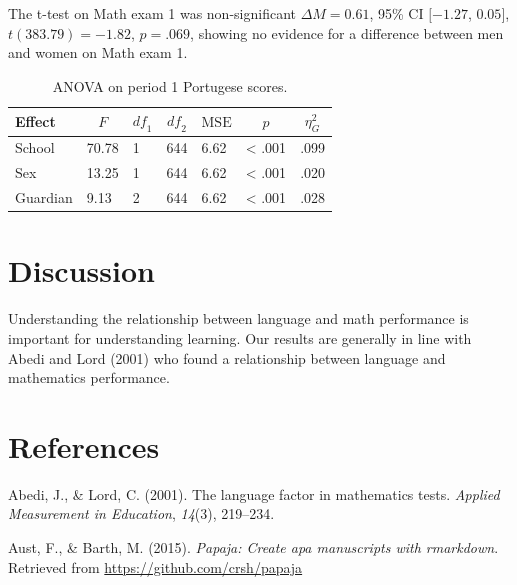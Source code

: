 \documentclass[english,floatsintext,man]{apa6}
\theoremstyle{definition}
\theoremstyle{definition}
\theoremstyle{definition}
\theoremstyle{remark}
\begin{document}
The t-test on Math exam 1 was non-significant \(\Delta M = 0.61\), 95\%
CI \([-1.27\), \(0.05]\), \(t(383.79) = -1.82\), \(p = .069\), showing
no evidence for a difference between men and women on Math exam 1.

\begin{table}[tbp]
\begin{center}
\begin{threeparttable}
\caption{\label{tab:unnamed-chunk-1}ANOVA on period 1 Portugese scores.}
\begin{tabular}{lllllll}
\toprule
Effect & \multicolumn{1}{c}{$F$} & \multicolumn{1}{c}{$\mathit{df}_1$} & \multicolumn{1}{c}{$\mathit{df}_2$} & \multicolumn{1}{c}{$\mathrm{MSE}$} & \multicolumn{1}{c}{$p$} & \multicolumn{1}{c}{$\eta^2_G$}\\
\midrule
School & 70.78 & 1 & 644 & 6.62 & < .001 & .099\\
Sex & 13.25 & 1 & 644 & 6.62 & < .001 & .020\\
Guardian & 9.13 & 2 & 644 & 6.62 & < .001 & .028\\
\bottomrule
\end{tabular}
\end{threeparttable}
\end{center}
\end{table}

\section{Discussion}\label{discussion}

Understanding the relationship between language and math performance is
important for understanding learning. Our results are generally in line
with Abedi and Lord (2001) who found a relationship between language and
mathematics performance.

\section{References}\label{references}

\setlength{\parindent}{-0.5in} \setlength{\leftskip}{0.5in}
\setlength{\parskip}{8pt}

\hypertarget{refs}{}
\hypertarget{ref-abedi2001language}{}
Abedi, J., \& Lord, C. (2001). The language factor in mathematics tests.
\emph{Applied Measurement in Education}, \emph{14}(3), 219--234.

\hypertarget{ref-aust2015papaja}{}
Aust, F., \& Barth, M. (2015). \emph{Papaja: Create apa manuscripts with
rmarkdown}. Retrieved from \url{https://github.com/crsh/papaja}
\end{document}
